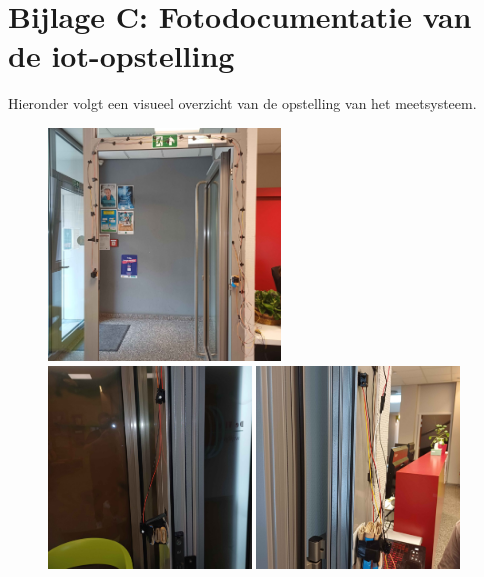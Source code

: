 \begin{figure}[h!]
\begin{minipage}{0.48\textwidth}
{        }
    \end{minipage}
    \label{fig:iot_test}
\end{figure}

\clearpage

\appendix
\section*{Bijlage C: Fotodocumentatie van de \gls{iot}-opstelling}

Hieronder volgt een visueel overzicht van de opstelling van het meetsysteem.

\begin{figure}[h!]
    \centering
    \includegraphics[width=0.55\textwidth]{img/bp/wachtruimtes/technische_uitwerking/door.jpg}
    \hspace{0.02\textwidth}
    \includegraphics[width=0.48\textwidth]{img/bp/wachtruimtes/technische_uitwerking/emitters.jpg}
    \hspace{0.02\textwidth}
    \includegraphics[width=0.48\textwidth]{img/bp/wachtruimtes/technische_uitwerking/receivers.jpg}

\end{figure}
